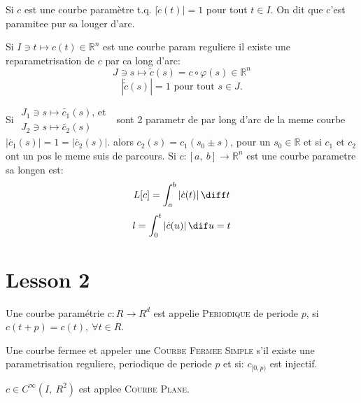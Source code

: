 \begin{definition}
Si $c$ est une courbe paramètre t.q. $|\dot{c}(t)|=1$ pour tout $t\in I$. On dit que c'est paramitee pur sa louger d'arc.
\end{definition}

\begin{proposition}
Si $I\ni t\mapsto c(t)\in \mathbb{R}^n$ est une courbe param reguliere il existe une reparametrisation de $c$ par ca long d'arc:
$$J\ni s\mapsto \tilde{c}(s)=c\circ\varphi(s)\in \mathbb{R}^n$$
$$|\dot{\tilde{c}}(s)|=1 \mbox{ pour tout } s\in J.$$
\end{proposition}

\begin{lemme}
Si $
\begin{array}{rl} 
J_1\ni s \mapsto \tilde{c_1}(s)\mbox{, et }\\ 
J_2\ni s \mapsto \tilde{c_2}(s)
\end{array} $
sont 2 parametr de par long d'arc de la meme courbe $|\dot{c_1}(s)| = 1 = |\dot{c_2}(s)|$.
alors $c_2(s)=c_1(s_0\pm s)$, pour un $s_0\in \mathbb{R}$ et si $c_1$ et $c_2$ ont un pos le meme suis de parcours. Si $c:[a,\ b]\rightarrow \mathbb{R}^n$ est une courbe parametre sa longen est:
$$ L[c] = \int_{a}^{b} |\dot{c}(t)|\, \diff t$$
$$l =\int_{0}^{t} |\dot{c}(u)|\mathop{\dif u} = t$$ %
\end{lemme}

\section{Lesson 2} %
\label{sec:lesson_2}


\begin{definition}
	Une courbe paramétrie $c:R\rightarrow R^d$ est appelie \textsc{Periodique} de periode $p$, si $c(t+p)=c(t),\ \forall t\in R$.
\end{definition}

\begin{definition}
	Une courbe fermee et appeler une \textsc{Courbe Fermee Simple} s'il existe une parametrisation reguliere, periodique de periode $p$ et si: $c_{[0, p)}$ est injectif.
\end{definition}

\begin{definition}
	$c\in C^\infty(I,\ R^2)$ est applee \textsc{Courbe Plane}.
\end{definition}

